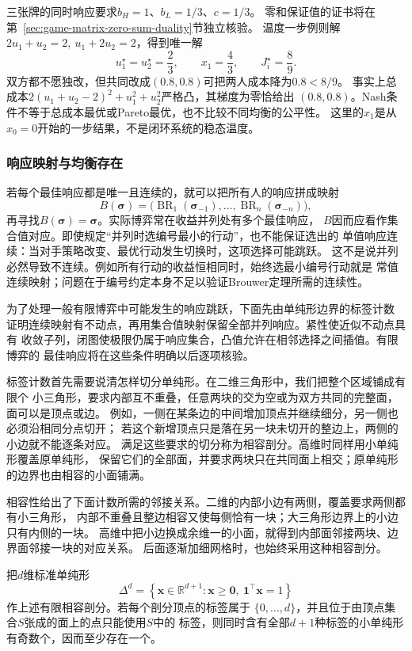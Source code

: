 三张牌的同时响应要求\(b_H=1\)、\(b_L=1/3\)、\(c=1/3\)。
零和保证值的证书将在第~\ref{sec:game-matrix-zero-sum-duality}节独立核验。
温度一步例则解
\(2u_1+u_2=2,\ u_1+2u_2=2\)，得到唯一解
\[
  u_1^\star=u_2^\star=\frac23,\qquad x_1=\frac43,\qquad J_i^\star=\frac89.
\]
双方都不愿独改，但共同改成\((0.8,0.8)\)可把两人成本降为\(0.8<8/9\)。
事实上总成本\(2(u_1+u_2-2)^2+u_1^2+u_2^2\)严格凸，其梯度为零恰给出
\((0.8,0.8)\)。Nash条件不等于总成本最优或Pareto最优，也不比较不同均衡的公平性。
这里的\(x_1\)是从\(x_0=0\)开始的一步结果，不是闭环系统的稳态温度。

\subsubsection{响应映射与均衡存在}
\label{sec:game-equilibrium-existence}

若每个最佳响应都是唯一且连续的，就可以把所有人的响应拼成映射
\[
  B(\bm{\sigma})
  =
  \bigl(
    \operatorname{BR}_1(\bm{\sigma}_{-1}),\ldots,
    \operatorname{BR}_n(\bm{\sigma}_{-n})
  \bigr),
\]
再寻找\(B(\bm{\sigma})=\bm{\sigma}\)。实际博弈常在收益并列处有多个最佳响应，
\(B\)因而应看作集合值对应。即使规定“并列时选编号最小的行动”，也不能保证选出的
单值响应连续：当对手策略改变、最优行动发生切换时，这项选择可能跳跃。
这不是说并列必然导致不连续。例如所有行动的收益恒相同时，始终选最小编号行动就是
常值连续映射；问题在于编号约定本身不足以验证Brouwer定理所需的连续性。

为了处理一般有限博弈中可能发生的响应跳跃，下面先由单纯形边界的标签计数
证明连续映射有不动点，再用集合值映射保留全部并列响应。紧性使近似不动点具有
收敛子列，闭图使极限仍属于响应集合，凸值允许在相邻选择之间插值。有限博弈的
最佳响应将在这些条件明确以后逐项核验。

标签计数首先需要说清怎样切分单纯形。在二维三角形中，我们把整个区域铺成有限个
小三角形，要求内部互不重叠，任意两块的交为空或为双方共同的完整面，面可以是顶点或边。
例如，一侧在某条边的中间增加顶点并继续细分，另一侧也必须沿相同分点切开；
若这个新增顶点只是落在另一块未切开的整边上，两侧的小边就不能逐条对应。
满足这些要求的切分称为相容剖分。高维时同样用小单纯形覆盖原单纯形，
保留它们的全部面，并要求两块只在共同面上相交；原单纯形的边界也由相容的小面铺满。

相容性给出了下面计数所需的邻接关系。二维的内部小边有两侧，覆盖要求两侧都有小三角形，
内部不重叠且整边相容又使每侧恰有一块；大三角形边界上的小边只有内侧的一块。
高维中把小边换成余维一的小面，就得到内部面邻接两块、边界面邻接一块的对应关系。
后面逐渐加细网格时，也始终采用这种相容剖分。
\begin{lemma}[Sperner引理]
\label{lem:game-sperner}
把\(d\)维标准单纯形
\[
  \Delta^d
  =
  \left\{
    \bm{x}\in\mathbb{R}^{d+1}:
    \bm{x}\geq\bm{0},\
    \bm{1}^{\top}\bm{x}=1
  \right\}
\]
作上述有限相容剖分。若每个剖分顶点的标签属于
\(\{0,\ldots,d\}\)，并且位于由顶点集合\(S\)张成的面上的点只能使用\(S\)中的
标签，则同时含有全部\(d+1\)种标签的小单纯形有奇数个，因而至少存在一个。
\end{lemma}

